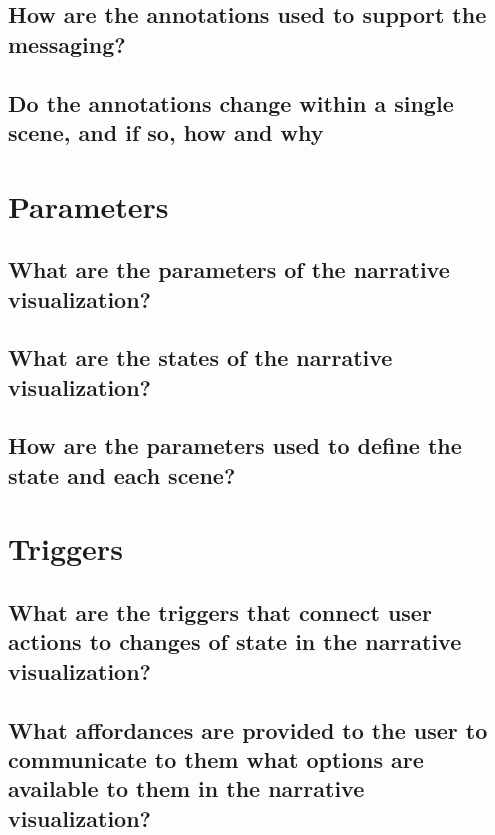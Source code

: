 \documentclass[letterpaper, 11pt]{article}
\begin{document}
\subsection{How are the annotations used to support the messaging?}
\label{subsec:Annotations2}
\subsection{Do the annotations change within a single scene, and if so, how and why}
\label{subsec:Annotations3}

\section{Parameters}
\label{sec:Parameters}
\subsection{What are the parameters of the narrative visualization?}
\label{subsec:Parameters1}
\subsection{What are the states of the narrative visualization?}
\label{subsec:Parameters2}
\subsection{How are the parameters used to define the state and each scene?}
\label{subsec:Parameters3}


\section{Triggers}
\label{sec:Triggers}
\subsection{What are the triggers that connect user actions to changes of state in the narrative visualization?}
\label{subsec:Triggers1}
\subsection{What affordances are provided to the user to communicate to them what options are available to them in the narrative visualization?}
\label{subsec:Triggers2}



% 
% 
\end{document}
